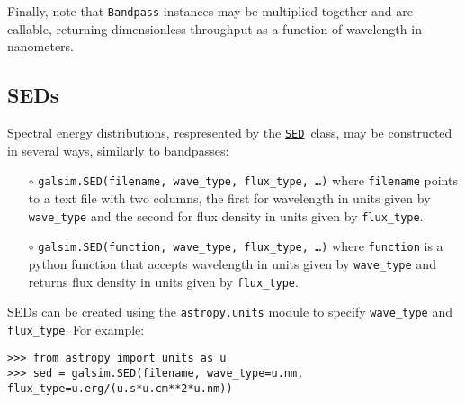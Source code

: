 \documentclass[preprint,10pt]{../../devel/modules/aastex}
\newcommand\SED{\href{http://galsim-developers.github.io/GalSim/classgalsim_1_1sed_1_1_s_e_d.html}{\texttt{SED}}}
\begin{document}
Finally, note that \texttt{Bandpass} instances may be multiplied
together and are callable, returning dimensionless throughput as a
function of wavelength in nanometers.

\subsection{SEDs}
Spectral energy distributions, respresented by the \SED\ class,
may be constructed in several ways, similarly to bandpasses:
\begin{itemize}
  \item[$\circ$]
  \texttt{galsim.SED(filename, wave\_type, flux\_type, \dots)}
    \newline
    where \texttt{filename} points to a
    text file with two columns, the first for wavelength in units given by \texttt{wave\_type} and the second for flux
    density in units given by \texttt{flux\_type}.
  \item[$\circ$]
  \texttt{galsim.SED(function, wave\_type, flux\_type, \dots)}
    \newline
    where \texttt{function} is a python
    function that accepts wavelength in units given by \texttt{wave\_type} and returns flux density in units given by \texttt{flux\_type}.
\end{itemize}

SEDs can be created using the \texttt{astropy.units} module to specify \texttt{wave\_type} and \texttt{flux\_type}.  For example:

\begin{verbatim}
>>> from astropy import units as u
>>> sed = galsim.SED(filename, wave_type=u.nm, flux_type=u.erg/(u.s*u.cm**2*u.nm))
\end{verbatim}
\end{document}
